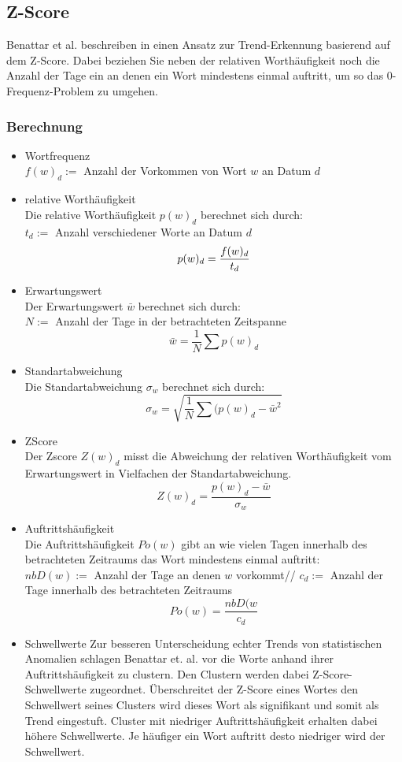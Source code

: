 \subsection{Z-Score}
Benattar et al. beschreiben in \cite{benattar2011trend} einen Ansatz zur Trend-Erkennung basierend auf dem Z-Score. Dabei beziehen Sie neben der relativen Worthäufigkeit noch die Anzahl der Tage ein an denen ein Wort mindestens einmal auftritt, um so das 0-Frequenz-Problem zu umgehen.

\subsubsection{Berechnung}
\begin{itemize}
	\item{Wortfrequenz}\\
		$f(w)_d :=$ Anzahl der Vorkommen von Wort $w$ an Datum $d$
	\item{relative Worthäufigkeit}\\
		Die relative Worthäufigkeit $p(w)_d$ berechnet sich durch: \\
		$t_d :=$ Anzahl verschiedener Worte an Datum $d$
		$$ p(w)_d = \frac{f(w)_d}{t_d} \\ $$
	\item{Erwartungswert}\\
		Der Erwartungswert $\bar{w}$ berechnet sich durch: \\
		$N:=$ Anzahl der Tage in der betrachteten Zeitspanne
		$$\bar{w}=\frac{1}{N} \sum p(w)_d$$
	\item{Standartabweichung}\\
		Die Standartabweichung $\sigma_w$ berechnet sich durch:
		$$\sigma_w = \sqrt{\frac{1}{N} \sum (p(w)_d - \bar{w}^2}$$
	\item{ZScore}\\
		Der Zscore $Z(w)_d$ misst die Abweichung der relativen Worthäufigkeit vom Erwartungswert in Vielfachen der Standartabweichung.
		$$Z(w)_d= \frac{p(w)_d - \bar{w}}{\sigma_w}$$		
	\item{Auftrittshäufigkeit}\\
		Die Auftrittshäufigkeit $Po(w)$ gibt an wie vielen Tagen innerhalb des betrachteten Zeitraums das Wort mindestens einmal auftritt:\\
		$nbD(w) :=$ Anzahl der Tage an denen $w$ vorkommt//
		$c_d:=$ Anzahl der Tage innerhalb des betrachteten Zeitraums
		$$Po(w)=\frac{nbD(w}{c_d}$$
	\item{Schwellwerte}
		Zur besseren Unterscheidung echter Trends von statistischen Anomalien schlagen Benattar et. al. vor die Worte anhand ihrer Auftrittshäufigkeit zu clustern. Den Clustern werden dabei Z-Score-Schwellwerte zugeordnet. Überschreitet der Z-Score eines Wortes den Schwellwert seines Clusters wird dieses Wort als signifikant und somit als Trend eingestuft. Cluster mit niedriger Auftrittshäufigkeit erhalten dabei höhere Schwellwerte. Je häufiger ein Wort auftritt desto niedriger wird der Schwellwert. 
		
		
\end{itemize}

